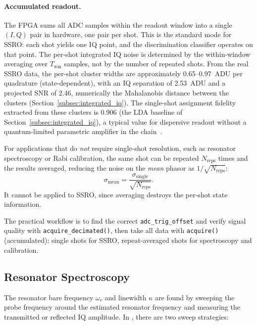 \paragraph{Accumulated readout.}
The FPGA sums all ADC samples within the readout window into a single $(I, Q)$
pair in hardware, one pair per shot.  This is the standard mode for SSRO: each
shot yields one IQ point, and the discrimination classifier operates on that
point.  The per-shot integrated IQ noise is determined by the within-window
averaging over $T_\text{win}$ samples, not by the number of repeated shots.
From the real SSRO data, the per-shot cluster widths are approximately
\SI{0.65}{}--\SI{0.97}{ADU} per quadrature (state-dependent), with an IQ
separation of \SI{2.53}{ADU} and a projected SNR of 2.46, numerically the
Mahalanobis distance between the clusters
(Section~\ref{subsec:integrated_iq}).  The single-shot
assignment fidelity extracted from these clusters is 0.906 (the LDA baseline of
Section~\ref{subsec:integrated_iq}), a typical value for dispersive readout
without a quantum-limited parametric amplifier in the chain~\cite{Krantz2019}.

For applications that do \emph{not} require single-shot resolution, such as
resonator spectroscopy or Rabi calibration, the same shot can be repeated
$N_\text{reps}$ times and the results averaged, reducing the noise on the
\emph{mean} phasor as $1/\sqrt{N_\text{reps}}$:
\begin{equation}
  \sigma_\text{mean} = \frac{\sigma_\text{single}}{\sqrt{N_\text{reps}}}.
\end{equation}
It cannot
be applied to SSRO, since averaging destroys the per-shot state information.

The practical workflow is to find the correct \texttt{adc\_trig\_offset} and
verify signal quality with \texttt{acquire\_decimated()}, then take all data with
\texttt{acquire()} (accumulated): single shots for SSRO, repeat-averaged shots for
spectroscopy and calibration.

\subsection{Resonator Spectroscopy}
\label{subsec:spectroscopy}

The resonator bare frequency $\omega_r$ and linewidth $\kappa$ are found by
sweeping the probe frequency around the estimated resonator frequency and measuring
the transmitted or reflected IQ amplitude.  In \QICK{}, there are two sweep
strategies:

